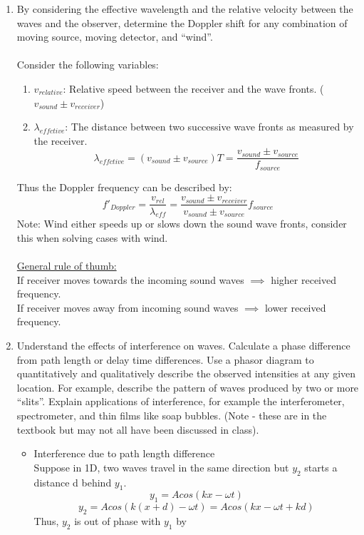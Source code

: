 \documentclass[12pt]{article}
\begin{document}
\begin{enumerate}
\begin{itemize}
\end{itemize}
    \item By considering the effective wavelength and the relative velocity between the waves and the observer, determine the Doppler shift for any combination of moving source, moving detector, and ``wind''.\\ \\
    Consider the following variables:
    \begin{enumerate}
    \item $v_{relative}$: Relative speed between the receiver and the wave fronts. ($v_{sound}\pm v_{receiver}$)
    \item $\lambda_{effctive}$: The distance between two successive wave fronts as measured by the receiver. 
    \[\lambda_{effctive}=(v_{sound} \pm v_{source})T=\frac{v_{sound} \pm v_{source}}{f_{source}}\]
    \end{enumerate} 
    Thus the Doppler frequency can be described by:
    \[f'_{Doppler}=\frac{v_{rel}}{\lambda_{eff}}=\frac{v_{sound}\pm v_{receiver}}{v_{sound} \pm v_{source}}f_{source}\]
    Note: Wind either speeds up or slows down the sound wave fronts, consider this when solving cases with wind.\\\\
    \underline{General rule of thumb:} \\If receiver moves towards the incoming sound waves $\implies$ higher received frequency. \\If receiver moves away from incoming sound waves $\implies$ lower received frequency.
    \newpage
    \item Understand the effects of interference on waves. Calculate a phase difference from path length or delay time differences. Use a phasor diagram to quantitatively and qualitatively describe the observed intensities at any given location. For example, describe the pattern of waves produced by two or more ``slits''. Explain applications of interference, for example the interferometer, spectrometer, and thin films like soap bubbles. (Note - these are in the textbook but may not all have been discussed in class).
    \begin{itemize}
        \item Interference due to path length difference
        \\Suppose in 1D, two waves travel in the same direction but $y_2$ starts a distance d behind $y_1$.
        \[y_1=Acos(kx-\omega t)\]
        \[y_2=Acos(k(x+d)-\omega t)=Acos(kx-\omega t+kd)\]
        Thus, $y_2$ is out of phase with $y_1$ by

\end{itemize}
\end{enumerate}
\end{document}
